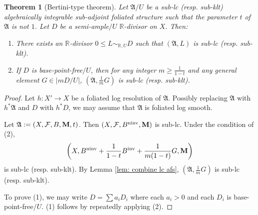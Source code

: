 \documentclass[12pt]{amsart}
\numberwithin{equation}{section}
\newcommand{\Mm}{{\bf{M}}}
\newcommand{\Rr}{\mathbb{R}}
\newcommand{\ninv}{\operatorname{ninv}}
\newcommand{\inv}{\operatorname{inv}}
\newcommand{\Aa}{{\mathfrak{A}}}
\newcommand{\Ff}{\mathcal{F}}
\newtheorem{thm}{Theorem}[section]
\theoremstyle{definition}
\theoremstyle{definition}
\theoremstyle{definition}
\begin{document}
\begin{thm}[Bertini-type theorem]\label{thm: Bertini type theorem}
    Let $\Aa/U$ be a sub-lc (resp. sub-klt) algebraically integrable sub-adjoint foliated structure such that the parameter $t$ of $\Aa$ is not $1$. Let $D$ be a semi-ample$/U$ $\Rr$-divisor on $X$. Then:
    \begin{enumerate}
      \item  There exists an $\Rr$-divisor $0\leq L\sim_{\mathbb R,U}D$ such that $(\Aa,L)$ is sub-lc (resp. sub-klt).
      \item If $D$ is base-point-free$/U$, then for any integer $m\geq\frac{1}{1-t}$ and any general element $G\in |mD/U|$, $(\Aa,\frac{1}{m}G)$ is sub-lc  (resp. sub-klt).
    \end{enumerate}
\end{thm}
\begin{proof}
Let $h: X'\rightarrow X$ be a foliated log resolution of $\Aa$. Possibly replacing $\Aa$ with $h^*\Aa$ and $D$ with $h^*D$, we may assume that $\Aa$ is foliated log smooth. 

Let $\Aa:=(X,\Ff,B,\Mm,t)$. Then $(X,\Ff,B^{\ninv},\Mm)$ is sub-lc. Under the condition of (2), 
$$\left(X,B^{\ninv}+\frac{1}{1-t}B^{\inv}+\frac{1}{m(1-t)}G,\Mm\right)$$
is sub-lc (resp. sub-klt). By Lemma \ref{lem: combine lc afs}, $(\Aa,\frac{1}{m}G)$ is sub-lc (resp. sub-klt). 

To prove (1), we may write $D=\sum a_iD_i$ where each $a_i>0$ and each $D_i$ is base-point-free$/U$. (1) follows by repeatedly applying (2).
\end{proof}
\end{document}
